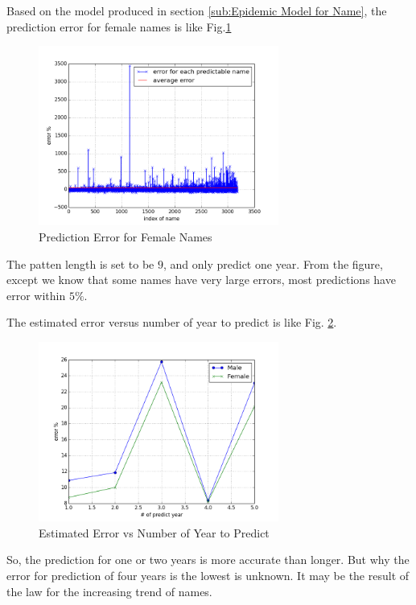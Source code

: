 \documentclass[journal]{IEEEtran}
\begin{document}
Based on the model produced in section \ref{sub:Epidemic Model for Name}, the prediction error for female names is like Fig.\ref{fig:Prediction Error for Female Names}
\begin{figure}[ht]
	\centering
	\includegraphics[width = 3.1in]{figure/error_female_13_9_1.png}
	\caption{Prediction Error for Female Names}
	\label{fig:Prediction Error for Female Names}
\end{figure}

The patten length is set to be $9$, and only predict one year. From the figure, except we know that some names have very large errors, most predictions have error within $5\%$.

The estimated error versus number of year to predict is like Fig. \ref{fig:Estimated Error vs Number of Year to Predict}.
\begin{figure}[ht]
	\centering
	\includegraphics[width = 3.1in]{figure/error_vs_predictYear.png}
	\caption{Estimated Error vs Number of Year to Predict}
	\label{fig:Estimated Error vs Number of Year to Predict}
\end{figure}

So, the prediction for one or two years is more accurate than longer. But why the error for prediction of four years is the lowest is unknown. It may be the result of the law for the increasing trend of names.
\end{document}
